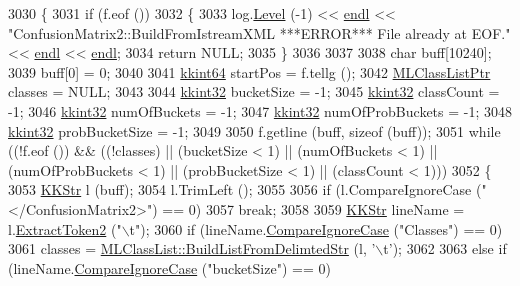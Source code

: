 \begin{DoxyCode}
3030 \{
3031   \textcolor{keywordflow}{if}  (f.eof ())
3032   \{
3033     log.\hyperlink{class_k_k_b_1_1_run_log_a32cf761d7f2e747465fd80533fdbb659}{Level} (-1) << \hyperlink{namespace_k_k_b_ad1f50f65af6adc8fa9e6f62d007818a8}{endl} << \textcolor{stringliteral}{"ConfusionMatrix2::BuildFromIstreamXML  ***ERROR***   File already
       at EOF."} << \hyperlink{namespace_k_k_b_ad1f50f65af6adc8fa9e6f62d007818a8}{endl} << \hyperlink{namespace_k_k_b_ad1f50f65af6adc8fa9e6f62d007818a8}{endl};
3034     \textcolor{keywordflow}{return}  NULL;
3035   \}
3036 
3037 
3038   \textcolor{keywordtype}{char}  buff[10240];
3039   buff[0] = 0;
3040 
3041   \hyperlink{namespace_k_k_b_aa3486b1c5ea9162b3b020c69f72826eb}{kkint64}   startPos = f.tellg ();
3042   \hyperlink{class_k_k_m_l_l_1_1_m_l_class_list}{MLClassListPtr}  classes = NULL;
3043 
3044   \hyperlink{namespace_k_k_b_a8fa4952cc84fda1de4bec1fbdd8d5b1b}{kkint32}  bucketSize        = -1;
3045   \hyperlink{namespace_k_k_b_a8fa4952cc84fda1de4bec1fbdd8d5b1b}{kkint32}  classCount        = -1;
3046   \hyperlink{namespace_k_k_b_a8fa4952cc84fda1de4bec1fbdd8d5b1b}{kkint32}  numOfBuckets      = -1;
3047   \hyperlink{namespace_k_k_b_a8fa4952cc84fda1de4bec1fbdd8d5b1b}{kkint32}  numOfProbBuckets  = -1;
3048   \hyperlink{namespace_k_k_b_a8fa4952cc84fda1de4bec1fbdd8d5b1b}{kkint32}  probBucketSize    = -1;
3049 
3050   f.getline (buff, \textcolor{keyword}{sizeof} (buff));
3051   \textcolor{keywordflow}{while}  ((!f.eof ())  &&  ((!classes)  ||  (bucketSize < 1)  ||  (numOfBuckets < 1)  ||  (numOfProbBuckets
       < 1)  ||  (probBucketSize < 1)  ||  (classCount < 1)))
3052   \{
3053     \hyperlink{class_k_k_b_1_1_k_k_str}{KKStr}  l (buff);
3054     l.TrimLeft ();
3055 
3056     \textcolor{keywordflow}{if}  (l.CompareIgnoreCase (\textcolor{stringliteral}{"</ConfusionMatrix2>"}) == 0)
3057       \textcolor{keywordflow}{break};
3058 
3059     \hyperlink{class_k_k_b_1_1_k_k_str}{KKStr}  lineName = l.\hyperlink{class_k_k_b_1_1_k_k_str_afe41140cee0520f0be8a3022938a1b03}{ExtractToken2} (\textcolor{stringliteral}{"\(\backslash\)t"});
3060     \textcolor{keywordflow}{if}  (lineName.\hyperlink{class_k_k_b_1_1_k_k_str_a3fd779d448f27e24170c9c05fca5208e}{CompareIgnoreCase} (\textcolor{stringliteral}{"Classes"}) == 0)
3061       classes = \hyperlink{class_k_k_m_l_l_1_1_m_l_class_list_a7c3d83212318e7fd8b06d7ae3522d145}{MLClassList::BuildListFromDelimtedStr} (l, \textcolor{charliteral}{'\(\backslash\)t'});
3062 
3063     \textcolor{keywordflow}{else} \textcolor{keywordflow}{if}  (lineName.\hyperlink{class_k_k_b_1_1_k_k_str_a3fd779d448f27e24170c9c05fca5208e}{CompareIgnoreCase} (\textcolor{stringliteral}{"bucketSize"}) == 0)

\end{DoxyCode}
